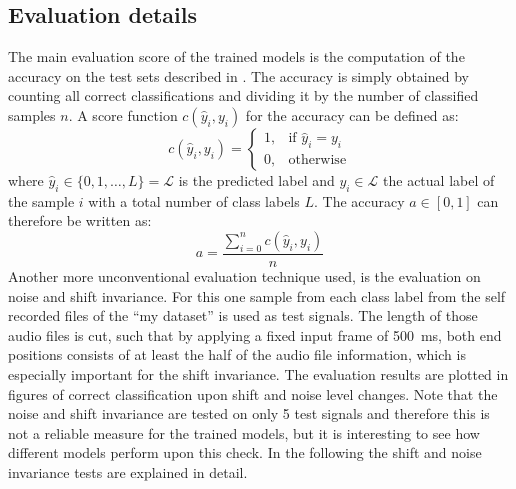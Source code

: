 
\subsection{Evaluation details}\label{sec:exp_details_tb}
The main evaluation score of the trained models is the computation of the accuracy on the test sets described in .
The accuracy is simply obtained by counting all correct classifications and dividing it by the number of classified samples $n$.
A score function $c(\hat{y}_i, y_i)$ for the accuracy can be defined as:
\begin{equation}
  c(\hat{y}_i, y_i) = 
  \begin{cases}
    1, & \text{if } \hat{y}_i = y_i\\
    0, & \text{otherwise} 
  \end{cases}
\end{equation}
where $\hat{y}_i \in \{0, 1, \dots, L\} = \mathcal{L}$ is the predicted label and $y_i \in \mathcal{L}$ the actual label of the sample $i$ with a total number of class labels $L$.
The accuracy $a \in [0, 1]$ can therefore be written as:
\begin{equation}
  a = \frac{\sum_{i=0}^n c(\hat{y}_i, y_i)}{n}
\end{equation}
Another more unconventional evaluation technique used, is the evaluation on noise and shift invariance.
For this one sample from each class label from the self recorded files of the \enquote{my dataset} is used as test signals.
The length of those audio files is cut, such that by applying a fixed input frame of \SI{500}{\milli\second}, both end positions consists of at least the half of the audio file information, which is especially important for the shift invariance.
The evaluation results are plotted in figures of correct classification upon shift and noise level changes.
Note that the noise and shift invariance are tested on only 5 test signals and therefore this is not a reliable measure for the trained models, but it is interesting to see how different models perform upon this check.
In the following the shift and noise invariance tests are explained in detail.




